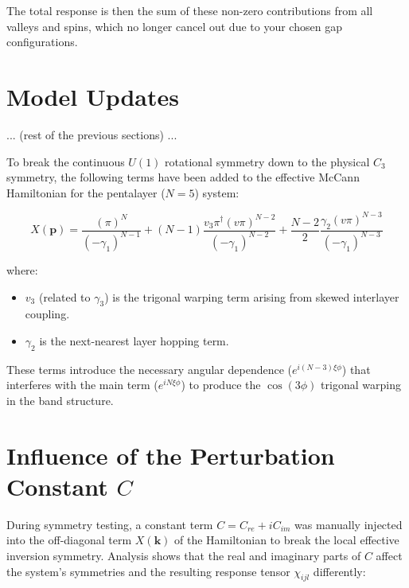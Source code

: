\documentclass{article}
\begin{document}
The total response is then the sum of these non-zero contributions from all valleys and spins, which no longer cancel out due to your chosen gap configurations.

\section{Model Updates}
... (rest of the previous sections) ...

To break the continuous $U(1)$ rotational symmetry down to the physical $C_3$ symmetry, the following terms have been added to the effective McCann Hamiltonian for the pentalayer ($N=5$) system:

\begin{equation}
    X(\mathbf{p}) = \frac{(\pi)^N}{(-\gamma_1)^{N-1}} + (N-1) \frac{v_3\pi^\dagger(v\pi)^{N-2}}{(-\gamma_1)^{N-2}} + \frac{N-2}{2} \frac{\gamma_2(v\pi)^{N-3}}{(-\gamma_1)^{N-3}}
\end{equation}

where:
\begin{itemize}
    \item $v_3$ (related to $\gamma_3$) is the trigonal warping term arising from skewed interlayer coupling.
    \item $\gamma_2$ is the next-nearest layer hopping term.
\end{itemize}

These terms introduce the necessary angular dependence ($e^{i(N-3)\xi\phi}$) that interferes with the main term ($e^{iN\xi\phi}$) to produce the $\cos(3\phi)$ trigonal warping in the band structure.

\section{Influence of the Perturbation Constant $C$}

During symmetry testing, a constant term $C = C_{re} + i C_{im}$ was manually injected into the off-diagonal term $X(\mathbf{k})$ of the Hamiltonian to break the local effective inversion symmetry. Analysis shows that the real and imaginary parts of $C$ affect the system's symmetries and the resulting response tensor $\chi_{ijl}$ differently:
\end{document}
